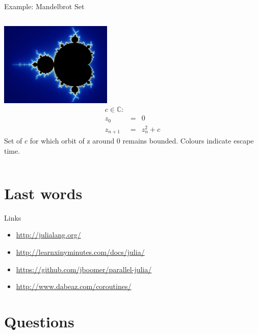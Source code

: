\documentclass{beamer}
\begin{document}
	\begin{frame}{Example: Mandelbrot Set}
		\begin{columns}[c]
			\includegraphics[height = 4cm]{figures/mandel_zoom.jpg}	
			\begin{equation*}
			\begin{array}{rcl}
				c\in\mathbb{C}: & & \\
				z_0 & = & 0	\\
				z_{n+1} & = & z_n^2 + c
			\end{array}
			\end{equation*}
			Set of $c$ for which orbit of z around 0 remains bounded. Colours indicate escape time.
		\end{columns}
	\end{frame}
	
	\section{Last words}
	
	\begin{frame}{Links}
		\begin{itemize}
			\item{\url{http://julialang.org/}}
			\item{\url{http://learnxinyminutes.com/docs/julia/}}
			\item{\url{https://github.com/jboomer/parallel-julia/}}
			\item{\url{http://www.dabeaz.com/coroutines/}}
		\end{itemize}
	\end{frame}
	
	\section{Questions}
\end{document}
